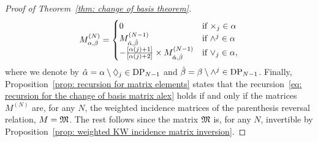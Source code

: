 \documentclass[oneside,english]{amsart}
\numberwithin{equation}{section}
\numberwithin{figure}{section}
\theoremstyle{plain}
\theoremstyle{plain}
\theoremstyle{plain}
\theoremstyle{remark}
\theoremstyle{plain}
\theoremstyle{plain}
\theoremstyle{plain}
\theoremstyle{plain}
\theoremstyle{plain}
\theoremstyle{plain}
\theoremstyle{plain}
\theoremstyle{plain}
\begin{document}
\begin{proof}[Proof of Theorem~\ref{thm: change of basis theorem}]
\begin{align}\label{eq: recursion for the change of basis matrix alex}
M_{\alpha,\beta}^{(N)} = \begin{cases} 
   0 & \text{if } \times_j \in \alpha \\
   M_{\hat{\alpha},\hat{\beta}}^{(N-1)}
   & \text{if } \wedge^j \in \alpha \\
   -\frac{\left[\alpha(j)+1\right]}{\left[\alpha(j)+2\right]} \times
   M_{\hat{\alpha},\hat{\beta}}^{(N-1)} 
   & \text{if } \vee_j \in \alpha,
\end{cases} 
\end{align}
where we denote by $\hat{\alpha} = \alpha \setminus \lozenge_j \in \mathrm{DP}_{N-1}$ and 
$\hat{\beta} = \beta \setminus \wedge^j \in \mathrm{DP}_{N-1}$. Finally,
Proposition~\ref{prop: recursion for matrix elements} states that the
recursion~\eqref{eq: recursion for the change of basis matrix alex} holds if
and only if the matrices  $M^{(N)}$ are, for any $N$, 
the weighted incidence matrices of the parenthesis reversal relation, $M=\mathfrak{M}$. The rest follows since
the matrix $\mathfrak{M}$ is, for any $N$, invertible by Proposition~\ref{prop: weighted KW incidence matrix inversion}.
\end{proof}


\bigskip
\end{document}

